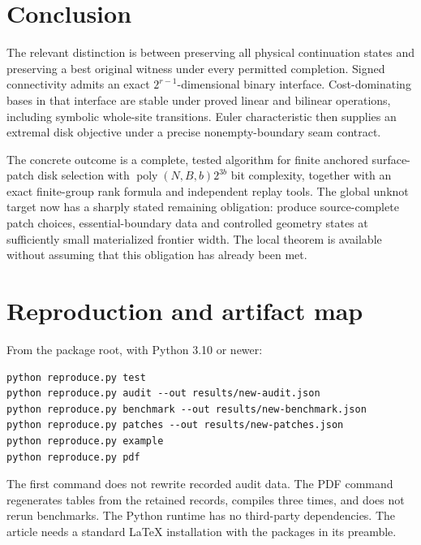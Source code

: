 \documentclass[11pt,letterpaper]{article}
\theoremstyle{definition}
\newcommand{\poly}{\operatorname{poly}}
\begin{document}
\section{Conclusion}
The relevant distinction is between preserving all physical continuation states and preserving a best original witness under every permitted completion. Signed connectivity admits an exact $2^{r-1}$-dimensional binary interface. Cost-dominating bases in that interface are stable under proved linear and bilinear operations, including symbolic whole-site transitions. Euler characteristic then supplies an extremal disk objective under a precise nonempty-boundary seam contract.

The concrete outcome is a complete, tested algorithm for finite anchored surface-patch disk selection with $\poly(N,B,b)2^{3b}$ bit complexity, together with an exact finite-group rank formula and independent replay tools. The global unknot target now has a sharply stated remaining obligation: produce source-complete patch choices, essential-boundary data and controlled geometry states at sufficiently small materialized frontier width. The local theorem is available without assuming that this obligation has already been met.

\appendix
\section{Reproduction and artifact map}
\label{app:artifacts}
From the package root, with Python 3.10 or newer:
\begin{verbatim}
python reproduce.py test
python reproduce.py audit --out results/new-audit.json
python reproduce.py benchmark --out results/new-benchmark.json
python reproduce.py patches --out results/new-patches.json
python reproduce.py example
python reproduce.py pdf
\end{verbatim}
The first command does not rewrite recorded audit data. The PDF command regenerates tables from the retained records, compiles three times, and does not rerun benchmarks. The Python runtime has no third-party dependencies. The article needs a standard LaTeX installation with the packages in its preamble.
\end{document}

